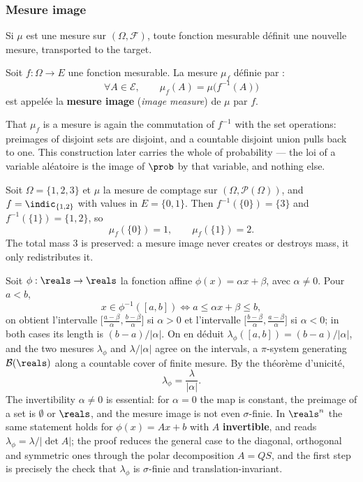 \subsubsection{Mesure image}

Si $\mu$ est une mesure sur $(\Omega,\mathcal{F})$, toute fonction mesurable définit
une nouvelle mesure, transported to the target.

\begin{definition}
  Soit $f : \Omega \to E$ une fonction mesurable. La mesure $\mu_{f}$ définie par :
  \[
    \forall A \in \mathcal{E}, \qquad \mu_{f}(A) = \mu\bigl(f^{-1}(A)\bigr)
  \]
  est appelée la \textbf{mesure image} (\textit{image measure}) de $\mu$ par $f$.
\end{definition}

That $\mu_{f}$ is a mesure is again the commutation of $f^{-1}$ with the set
operations: preimages of disjoint sets are disjoint, and a countable disjoint union
pulls back to one. This construction later carries the whole of probability --- the
loi of a variable aléatoire is the image of $\prob$ by that variable, and nothing
else.

\begin{example}
  Soit $\Omega = \{1,2,3\}$ et $\mu$ la mesure de comptage sur
  $(\Omega,\mathcal{P}(\Omega))$, and $f = \indic_{\{1,2\}}$ with values in $E =
  \{0,1\}$. Then $f^{-1}(\{0\}) = \{3\}$ and $f^{-1}(\{1\}) = \{1,2\}$, so
  \[
    \mu_{f}(\{0\}) = 1, \qquad \mu_{f}(\{1\}) = 2 .
  \]
  The total mass $3$ is preserved: a mesure image never creates or destroys mass,
  it only redistributes it.
\end{example}

\begin{example}
  Soit $\phi : \reals \to \reals$ la fonction affine $\phi(x) = \alpha x + \beta$,
  avec \textbf{$\alpha \neq 0$}. Pour $a < b$,
  \[
    x \in \phi^{-1}([a,b])
    \iff a \leq \alpha x + \beta \leq b,
  \]
  on obtient l'intervalle $\bigl[\tfrac{a-\beta}{\alpha}, \tfrac{b-\beta}{\alpha}
  \bigr]$ si $\alpha > 0$ et l'intervalle $\bigl[\tfrac{b-\beta}{\alpha},
  \tfrac{a-\beta}{\alpha}\bigr]$ si $\alpha < 0$; in both cases its length is
  $(b-a)/|\alpha|$. On en déduit $\lambda_{\phi}([a,b]) = (b-a)/|\alpha|$, and the
  two mesures $\lambda_{\phi}$ and $\lambda/|\alpha|$ agree on the intervals, a
  $\pi$-system generating $\mathcal{B}(\reals)$ along a countable cover of finite
  mesure. By the théorème d'unicité,
  \[
    \lambda_{\phi} = \frac{\lambda}{|\alpha|} .
  \]
  The invertibility $\alpha \neq 0$ is essential: for $\alpha = 0$ the map is
  constant, the
  preimage of a set is $\emptyset$ or $\reals$, and the mesure image is not even
  $\sigma$-finie. In $\reals^{n}$ the same statement holds for $\phi(x) = Ax + b$
  with $A$ \textbf{invertible}, and reads $\lambda_{\phi} = \lambda/|\det A|$;
  the proof reduces the general case to the diagonal, orthogonal and symmetric ones
  through the polar decomposition $A = QS$, and the first step is precisely the
  check that $\lambda_{\phi}$ is $\sigma$-finie and translation-invariant.
\end{example}

